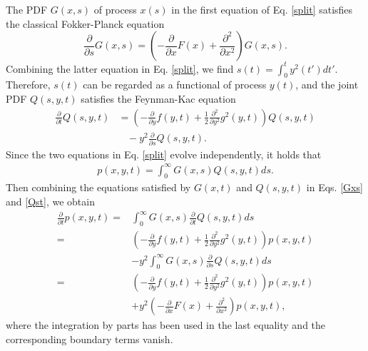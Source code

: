 \documentclass[aps,pre,twocolumn,groupedaddress,longbibliography]{revtex4-2}
\begin{document}
The PDF $G(x,s)$ of process $x(s)$ in the first equation of Eq. \eqref{split} satisfies the classical Fokker-Planck equation \cite{Risken:1989,CoffeyKalmykovWaldron:2004}
\begin{equation}\label{Gxs}
\frac{\partial}{\partial s}G(x,s)=\left(-\frac{\partial}{\partial x}F(x)+\frac{\partial^2}{\partial x^2}\right)G(x,s).
\end{equation}
Combining the latter equation in Eq. \eqref{split}, we find $s(t)=\int_0^ty^2(t')dt'$. Therefore, $s(t)$ can be regarded as a functional of process $y(t)$, and the joint PDF $Q(s,y,t)$ satisfies the Feynman-Kac equation \cite{WangChenDeng:2018,CairoliBaule:2017,TurgemanCarmiBarkai:2009}
\begin{equation}\label{Qst}
\begin{split}
\frac{\partial}{\partial t}Q(s,y,t)&=\left(-\frac{\partial}{\partial y}f(y,t)+\frac{1}{2}\frac{\partial^2}{\partial y^2}g^2(y,t)\right)Q(s,y,t)\\
&~~~~-y^2\frac{\partial}{\partial s}Q(s,y,t).
\end{split}
\end{equation}
Since the two equations in Eq. \eqref{split} evolve independently, it holds that
\begin{equation}
\begin{split}
p(x,y,t)=\int_0^\infty G(x,s)Q(s,y,t)ds.
\end{split}
\end{equation}
Then combining the equations satisfied by $G(x,t)$ and $Q(s,y,t)$ in Eqs. \eqref{Gxs} and \eqref{Qst}, we obtain
\begin{equation}\label{FKE1}
\begin{split}
\frac{\partial}{\partial t}p(x,y,t)=&\int_0^\infty G(x,s)\frac{\partial}{\partial t}Q(s,y,t)ds\\
=&\left(-\frac{\partial}{\partial y}f(y,t)+\frac{1}{2}\frac{\partial^2}{\partial y^2}g^2(y,t)\right)p(x,y,t)\\
&-y^2\int_0^\infty G(x,s)\frac{\partial}{\partial s}Q(s,y,t) ds\\
=&\left(-\frac{\partial}{\partial y}f(y,t)+\frac{1}{2}\frac{\partial^2}{\partial y^2}g^2(y,t)\right)p(x,y,t)\\
&+y^2\left(-\frac{\partial}{\partial x}F(x)+\frac{\partial^2}{\partial x^2}\right)p(x,y,t),
\end{split}
\end{equation}
where the integration by parts has been used in the last equality and the corresponding boundary terms vanish.
\end{document}
